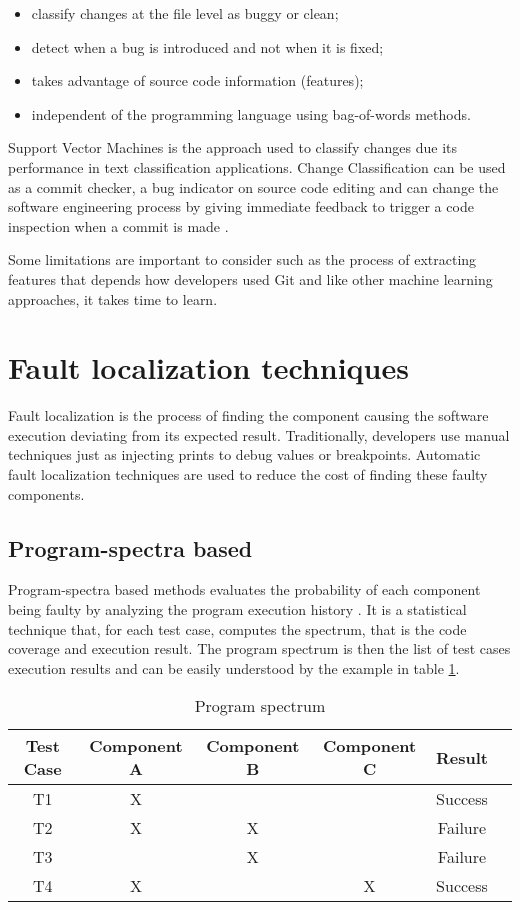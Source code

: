 \begin{itemize}
  \item classify changes at the file level as buggy or clean;
  \item detect when a bug is introduced and not when it is fixed;
  \item takes advantage of source code information (features);
  \item independent of the programming language using bag-of-words methods.
\end{itemize}

Support Vector Machines is the approach used to classify changes due its
performance in text classification applications. Change Classification can be
used as a commit checker, a bug indicator on source code editing and can change
the software engineering process by giving immediate feedback to trigger a code
inspection when a commit is made \cite{Kim2008}.

Some limitations are important to consider such as the process of extracting
features that depends how developers used Git and like other machine learning
approaches, it takes time to learn.

\section{Fault localization techniques}
Fault localization is the process of finding the component causing the software
execution deviating from its expected result. Traditionally, developers use
manual techniques just as injecting prints to debug values or breakpoints.
Automatic fault localization techniques are used to reduce the cost of finding
these faulty components.

\subsection{Program-spectra based}
Program-spectra based methods evaluates the probability of each component being
faulty by analyzing the program execution history \cite{Perez2004}. It is a
statistical technique that, for each test case, computes the spectrum, that is
the code coverage and execution result. The program spectrum is then the list
of test cases execution results and can be easily understood by the example in
table \ref{table:spectrum}.

\begin{table}[H]
    \begin{center}
    \caption{Program spectrum}
    \label{table:spectrum}
    \begin{tabular}{ | c | c | c | c | c | c |}
        \hline
        Test Case & Component A & Component B & Component C & Result \\ \hline
        T1 & X & & & Success \\ \hline
        T2 & X & X & & Failure \\ \hline
        T3 &  & X & & Failure \\ \hline
        T4 & X &  & X & Success \\ \hline
    \end{tabular}
    \end{center}
\end{table}

